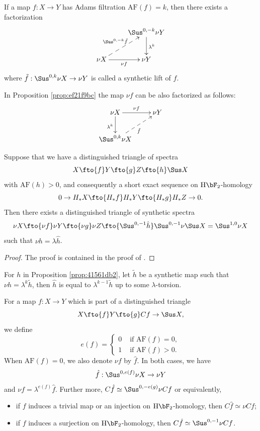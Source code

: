\documentclass{amsart}
\numberwithin{equation}{section}
\newcommand{\AF}{\mathrm{AF}}
\newcommand{\HF}{\mathrm{H}\bF_2}
\begin{document}
\begin{proposition}\label{prop:ef21f9bc}
    If a map $f:X\to Y$ has Adams filtration $\AF(f)=k$, then there exists a factorization
    $$\xymatrix{
     & \Sus^{0,-k}\nu Y\ar[d]^{\lambda^k}\\
     \nu X \ar[r]_{\nu f}\ar@{-->}[ru]^{\Sus^{0,-k}\tilde f} & \nu Y
    }$$
    where $\tilde f: \Sus^{0,k}\nu X\to \nu Y$ is called a synthetic lift of $f$.
\end{proposition}

In Proposition \ref{prop:ef21f9bc} the map $\nu f$ can be also factorized as follows:
$$\xymatrix{
 \nu X \ar[r]^{\nu f}\ar[d]_{\lambda^k} & \nu Y\\
 \Sus^{0,k}\nu X\ar@{-->}[ru]_{\tilde f}
}$$


\begin{proposition}\label{prop:41561db2}
    Suppose that we have a  distinguished triangle of spectra
    $$X\fto{f} Y\fto{g} Z\fto{h} \Sus X$$
    with $\AF(h)>0$, and consequently a short exact sequence on $\HF$-homology
    $$0\to H_*X\fto{H_*f} H_*Y\fto{H_*g} H_*Z\to 0.$$
    Then there exists a distinguished triangle of synthetic spectra
    $$\nu X\fto{\nu f}\nu Y\fto{\nu g} \nu Z\fto{\Sus^{0,-1}\hat h} \Sus^{0,-1}\nu \Sus X=\Sus^{1,0}\nu X$$
    such that $\nu h=\lambda \hat h$.
\end{proposition}
\begin{proof}
    The proof is contained in the proof of \cite[Lemma 9.15]{BHS}.
\end{proof}

\begin{remark}
For $h$ in Proposition \ref{prop:41561db2}, let $\tilde h$ be a synthetic map such that $\nu h=\lambda^k\tilde h$, then $\hat h$ is equal to $\lambda^{k-1}\tilde h$ up to some $\lambda$-torsion. 
\end{remark}

\begin{notation} \label{not:fhat}
     For a map $f: X\to Y$ which is part of a distinguished triangle
    $$X\fto{f} Y\fto{g}Cf\to\Sus X,$$
    we define
    $$e(f)=\begin{cases}
     0 & \text{ if }\AF(f)=0,\\
     1 & \text{ if }\AF(f)>0.
    \end{cases}$$
    When $\AF(f)=0$, we also denote $\nu f$ by $\hat f$. In both cases, we have 
    $$\hat f: \Sus^{0,e(f)}\nu X\to \nu Y$$
    and $\nu f=\lambda^{e(f)}\hat f$. Further more, $C\hat f\simeq \Sus^{0,-e(g)}\nu Cf$ or equivalently,
    \begin{itemize}
        \item if $f$ induces a trivial map or an injection on $\HF$-homology, then $C\hat f\simeq \nu Cf$;
        \item if $f$ induces a surjection on $\HF$-homology, then $C\hat f \simeq \Sus^{0,-1}\nu Cf$.
    \end{itemize}
\end{notation}
\end{document}
